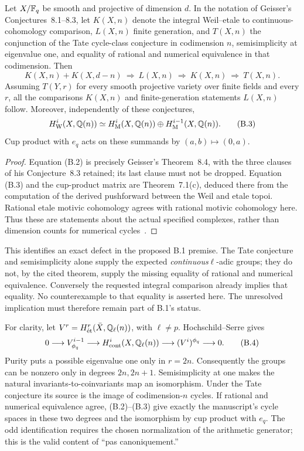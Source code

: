 \begin{theorem}\label{thm:B-Geisser-gate}
Let \(X/\mathbb F_q\) be smooth and projective of dimension \(d\).  In the
notation of Geisser's Conjectures~8.1--8.3, let \(K(X,n)\) denote the
integral Weil--etale to continuous-cohomology comparison, \(L(X,n)\)
finite generation, and \(T(X,n)\) the conjunction of the Tate cycle-class
conjecture in codimension \(n\), semisimplicity at eigenvalue one, and
equality of rational and numerical equivalence in that codimension.
Then
\[
 K(X,n)+K(X,d-n)\ \Longrightarrow\ L(X,n)
 \ \Longrightarrow\ K(X,n)\ \Longrightarrow\ T(X,n).
 \tag{B.2}
\]
Assuming \(T(Y,r)\) for every smooth projective variety over finite fields
and every \(r\), all the comparisons \(K(X,n)\) and finite-generation
statements \(L(X,n)\) follow.  Moreover, independently of these
conjectures,
\[
 H^i_{\mathrm W}(X,\mathbb Q(n))\simeq
 H^i_{\mathrm M}(X,\mathbb Q(n))\oplus H^{i-1}_{\mathrm M}(X,\mathbb Q(n)).
 \tag{B.3}
\]
Cup product with \(e_q\) acts on these summands by
\( (a,b)\mapsto(0,a)\).
\end{theorem}
\begin{proof}
Equation (B.2) is precisely Geisser's Theorem~8.4, with the three
clauses of his Conjecture~8.3 retained; its last clause must not be
dropped.  Equation (B.3) and the cup-product matrix are Theorem~7.1(c),
deduced there from the computation of the derived pushforward between
the Weil and etale topoi.  Rational etale motivic cohomology agrees with
rational motivic cohomology here.  Thus these are statements about the
actual specified complexes, rather than dimension counts for numerical
cycles~\cite[Theorems~7.1 and~8.4]{BGeisser2004}.
\end{proof}

This identifies an exact defect in the proposed B.1 premise.  The Tate
conjecture and semisimplicity alone supply the expected
\emph{continuous}\(\ell\)-adic groups; they do not, by the cited theorem,
supply the missing equality of rational and numerical equivalence.
Conversely the requested integral comparison already implies that
equality.  No counterexample to that equality is asserted here.  The
unresolved implication must therefore remain part of B.1's status.

For clarity, let \(V^r=H^r_{\mathrm{\acute et}}(\bar X,\mathbb Q_\ell(n))\), with
\(\ell\ne p\).  Hochschild--Serre gives
\[
0\longrightarrow V^{i-1}_{\phi_q}
\longrightarrow H^i_{\mathrm{cont}}(X,\mathbb Q_\ell(n))
\longrightarrow (V^i)^{\phi_q}\longrightarrow0.\tag{B.4}
\]
Purity puts a possible eigenvalue one only in \(r=2n\).
Consequently the groups can be nonzero only in degrees \(2n,2n+1\).
Semisimplicity at one makes the natural invariants-to-coinvariants map
an isomorphism.  Under the Tate conjecture its source is the image of
codimension-\(n\) cycles.  If rational and numerical equivalence agree,
(B.2)--(B.3) give exactly the manuscript's cycle spaces in these two
degrees and the isomorphism by cup product with \(e_q\).  The odd
identification requires the chosen normalization of the arithmetic
generator; this is the valid content of ``pas canoniquement.''

